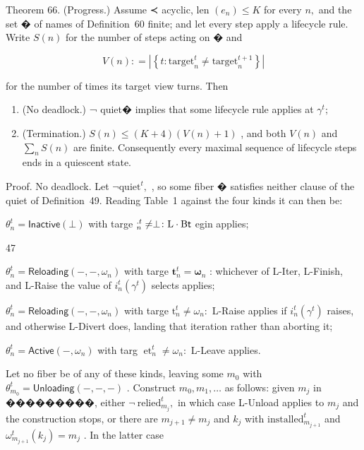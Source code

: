 \documentclass[
  10
]{article}
\begin{document}
Theorem 66. (Progress.) Assume ≺ acyclic, len \(( e _ { n } ) \leq K\)
for every \(n ,\) and the set � of names of Definition~60 finite; and
let every step apply a lifecycle rule. Write \(S ( n )\) for the number
of steps acting on � and

\[
V ( n ) : = \left| \left\{ t : \mathrm { t a r g e t } _ { n } ^ { t } \neq \mathrm { t a r g e t } _ { n } ^ { t + 1 } \right\} \right|\tag{61}
\]

for the number of times its target view turns. Then

\begin{enumerate}
\def\labelenumi{\arabic{enumi}.}
\item
  (No deadlock.) ¬ quiet� implies that some lifecycle rule applies at
  \(\gamma ^ { t } ;\)
\item
  (Termination.) \(S ( n ) \leq ( K + 4 ) ( V ( n ) + 1 )\) , and both
  \(V ( n )\) and \(\textstyle \sum _ { n } S ( n )\) are finite.
  Consequently every maximal sequence of lifecycle steps ends in a
  quiescent state.
\end{enumerate}

Proof. No deadlock. Let \(\neg \mathrm { q u i e t } ^ { t } ,\) , so
some fiber � satisfies neither clause of the quiet of Definition~49.
Reading Table~1 against the four kinds it can then be:

\(\theta _ { n } ^ { t } = \mathsf { I n a c t i v e } ( \bot )\) with
targe
\(^ { . t } _ { n } \neq \perp \colon \mathrm { L } \cdot \mathrm { B } { \sf t }\)
egin applies;

47

\(\theta _ { n } ^ { t } = \mathsf { R e l o a d i n g } ( - , - , \omega _ { n } )\)
with targe
\(\mathbf { t } _ { n } ^ { t } = { \boldsymbol { \omega } } _ { n }\) :
whichever of L-Iter, L-Finish, and L-Raise the value of
\(i _ { n } ^ { t } ( \gamma ^ { t } )\) selects applies;

\(\theta _ { n } ^ { t } = \mathsf { R e l o a d i n g } ( - , - , \omega _ { n } )\)
with targe
\(\mathrm { t } _ { n } ^ { t } \neq \omega _ { n } \mathrm { : }\)
L-Raise applies if \(i _ { n } ^ { t } ( \gamma ^ { t } )\) raises, and
otherwise L-Divert does, landing that iteration rather than aborting it;

\(\theta _ { n } ^ { t } = \mathsf { A c t i v e } ( - , \omega _ { n } )\)
with targ
\(\operatorname { e t } _ { n } ^ { t } \neq \omega _ { n } \colon\)
L-Leave applies.

Let no fiber be of any of these kinds, leaving some \(m _ { 0 }\) with
\(\theta _ { m _ { 0 } } ^ { t } = \mathsf { U n l o a d i n g } ( - , - , - )\)
. Construct \(m _ { 0 } , m _ { 1 } , \ldots\) as follows: given
\(m _ { j }\) in ���������, either
\(\mathrm { \neg ~ r e l i e d } _ { m _ { j } } ^ { t } ,\) in which
case L-Unload applies to \(m _ { j }\) and the construction stops, or
there are \(m _ { j + 1 } \neq m _ { j }\) and \(k _ { j }\) with
\(\mathrm { i n s t a l l e d } _ { m _ { j + 1 } } ^ { t }\) and
\(\omega _ { m _ { j + 1 } } ^ { t } ( k _ { j } ) = m _ { j }\) . In
the latter case
\end{document}
